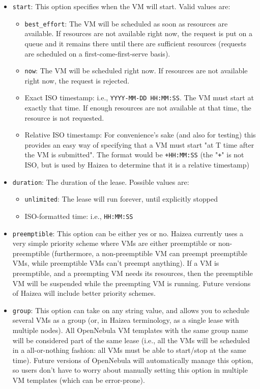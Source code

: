 \begin{itemize}
\item \texttt{start}: This option specifies when the VM will start. Valid values are:
\begin{itemize}
\item \texttt{best\_effort}: The VM will be scheduled as soon as resources are available. If resources are not available right now, the request is put on a queue and it remains there until there are sufficient resources (requests are scheduled on a first-come-first-serve basis).
\item \texttt{now}: The VM will be scheduled right now. If resources are not available right now, the request is rejected.
\item Exact ISO timestamp: i.e., \texttt{YYYY-MM-DD HH:MM:SS}. The VM must start at exactly that time. If enough resources are not available at that time, the resource is not requested.
\item Relative ISO timestamp: For convenience's sake (and also for testing) this provides an easy way of specifying that a VM must start "at T time after the VM is submitted". The format would be \texttt{+HH:MM:SS} (the "\texttt{+}" is not ISO, but is used by Haizea to determine that it is a relative timestamp)
\end{itemize}
\item \texttt{duration}: The duration of the lease. Possible values are:
\begin{itemize}
\item \texttt{unlimited}: The lease will run forever, until explicitly stopped
\item ISO-formatted time: i.e., \texttt{HH:MM:SS}
\end{itemize}
\item \texttt{preemptible}: This option can be either yes or no. Haizea currently uses a very simple priority scheme where VMs are either preemptible or non-preemptible (furthermore, a non-preemptible VM can preempt preemptible VMs, while preemptible VMs can't preempt anything). If a VM is preemptible, and a preempting VM needs its resources, then the preemptible VM will be suspended while the preempting VM is running. Future versions of Haizea will include better priority schemes.
\item \texttt{group}: This option can take on any string value, and allows you to schedule several VMs as a group (or, in Haizea terminology, as a single lease with multiple nodes). All OpenNebula VM templates with the same group name will be considered part of the same lease (i.e., all the VMs will be scheduled in a all-or-nothing fashion: all VMs must be able to start/stop at the same time). Future versions of OpenNebula will automatically manage this option, so users don't have to worry about manually setting this option in multiple VM templates (which can be error-prone). 
\end{itemize}

